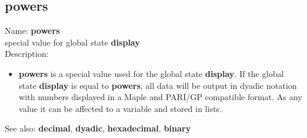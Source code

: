\subsection{ powers }
\noindent Name: \textbf{powers}\\
special value for global state \textbf{display}\\

\noindent Description: \begin{itemize}

\item \textbf{powers} is a special value used for the global state \textbf{display}.  If
   the global state \textbf{display} is equal to \textbf{powers}, all data will be
   output in dyadic notation with numbers displayed in a Maple and
   PARI/GP compatible format.
   As any value it can be affected to a variable and stored in lists.
\end{itemize}
See also: \textbf{decimal}, \textbf{dyadic}, \textbf{hexadecimal}, \textbf{binary}
